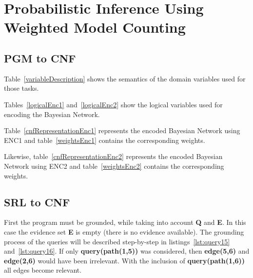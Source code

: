 \section{Probabilistic Inference Using Weighted Model Counting}
\subsection{PGM to CNF}

Table~\ref{variableDescription} shows the semantics of the domain variables used for those tasks.

Tables~\ref{logicalEnc1} and~\ref{logicalEnc2} show the logical variables used for encoding the Bayesian Network.

Table~\ref{cnfRepresentationEnc1} represents the encoded Bayesian Network using ENC1 and table~\ref{weightsEnc1} contains the corresponding weights.

Likewise, table~\ref{cnfRepresentationEnc2} represents the encoded Bayesian Network using ENC2 and table~\ref{weightsEnc2} contains the corresponding weights.





%



%




\subsection{SRL to CNF}

First the program must be grounded, while taking into account \textbf{Q} and \textbf{E}. In this case the evidence set \textbf{E} is empty (there is no evidence available). The grounding process of the queries will be described step-by-step in listings~\ref{lst:query15} and~\ref{lst:query16}.  If only \textbf{query(path(1,5))} was considered, then \textbf{edge(5,6)} and \textbf{edge(2,6)} would have been irrelevant. With the inclusion of \textbf{query(path(1,6))} all edges become relevant.



